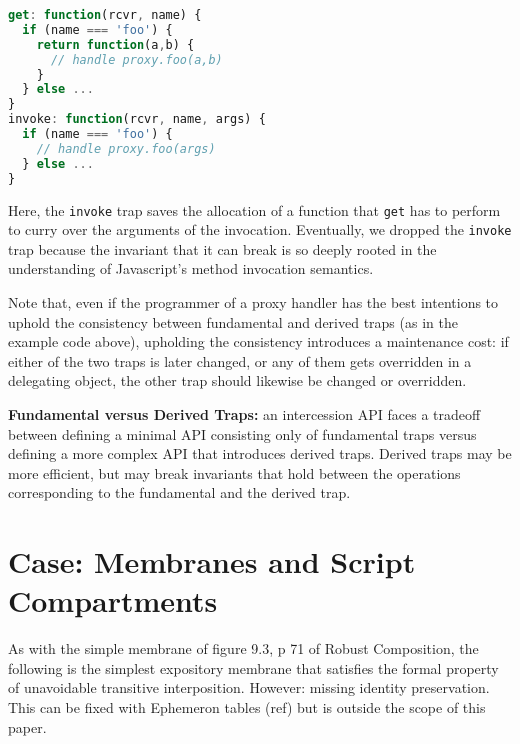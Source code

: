 \documentclass{acm_proc_article-sp}
\begin{document}
\begin{lstlisting}[language=javascript]
get: function(rcvr, name) {
  if (name === 'foo') {
    return function(a,b) {
      // handle proxy.foo(a,b)
    } 
  } else ...
}
invoke: function(rcvr, name, args) {
  if (name === 'foo') {
    // handle proxy.foo(args)
  } else ...
}
\end{lstlisting}

Here, the \texttt{invoke} trap saves the allocation of a function that \texttt{get} has to perform to curry over the arguments of the invocation. Eventually, we dropped the \texttt{invoke} trap because the invariant that it can break is so deeply rooted in the understanding of Javascript's method invocation semantics.

Note that, even if the programmer of a proxy handler has the best intentions to uphold the consistency between fundamental and derived traps (as in the example code above), upholding the consistency introduces a maintenance cost: if either of the two traps is later changed, or any of them gets overridden in a delegating object, the other trap should likewise be changed or overridden.

\textbf{Fundamental versus Derived Traps:} an intercession API faces a tradeoff between defining a minimal API consisting only of fundamental traps versus defining a more complex API that introduces derived traps. Derived traps may be more efficient, but may break invariants that hold between the operations corresponding to the fundamental and the derived trap.

\section{Case: Membranes and Script Compartments}
\label{sec:membranes}

As with the simple membrane of figure 9.3, p 71 of Robust Composition, the following is the simplest expository membrane that satisfies the formal property of unavoidable transitive interposition.
However: missing identity preservation. This can be fixed with Ephemeron tables (ref) but is outside the scope of this paper.
\end{document}
